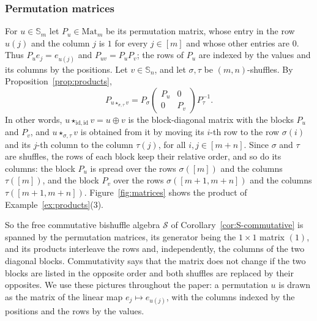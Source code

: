 \documentclass[11pt]{amsart}
\theoremstyle{definition}
\theoremstyle{remark}
\newcommand{\bS}{\mathbb{S}}
\newcommand{\cS}{\mathscr{S}}
\newcommand{\id}{\mathrm{id}}
\newcommand{\Mat}{\mathrm{Mat}}
\begin{document}
\subsubsection{Permutation matrices}
For $u\in\bS_m$ let $P_u\in\Mat_m$ be its permutation matrix, whose entry in the row $u(j)$ and the column $j$ is $1$ for every $j\in[m]$ and whose other entries are $0$. Thus $P_ue_j=e_{u(j)}$ and $P_{uv}=P_uP_v$; the rows of $P_u$ are indexed by the values and its columns by the positions. Let $v\in\bS_n$, and let $\sigma,\tau$ be $(m,n)$-shuffles. By Proposition~\ref{prop:products},
\[
P_{u\star_{\sigma,\tau}v}=P_\sigma\begin{pmatrix}P_u&0\\0&P_v\end{pmatrix}P_\tau^{-1}.
\]
In other words, $u\star_{\id,\id}v=u\oplus v$ is the block-diagonal matrix with the blocks $P_u$ and $P_v$, and $u\star_{\sigma,\tau}v$ is obtained from it by moving its $i$-th row to the row $\sigma(i)$ and its $j$-th column to the column $\tau(j)$, for all $i,j\in[m+n]$. Since $\sigma$ and $\tau$ are shuffles, the rows of each block keep their relative order, and so do its columns: the block $P_u$ is spread over the rows $\sigma([m])$ and the columns $\tau([m])$, and the block $P_v$ over the rows $\sigma([m+1,m+n])$ and the columns $\tau([m+1,m+n])$. Figure~\ref{fig:matrices} shows the product of Example~\ref{ex:products}(3).

So the free commutative bishuffle algebra $\cS$ of Corollary~\ref{cor:S-commutative} is spanned by the permutation matrices, its generator being the $1\times1$ matrix $(1)$, and its products interleave the rows and, independently, the columns of the two diagonal blocks. Commutativity says that the matrix does not change if the two blocks are listed in the opposite order and both shuffles are replaced by their opposites. We use these pictures throughout the paper: a permutation $u$ is drawn as the matrix of the linear map $e_j\mapsto e_{u(j)}$, with the columns indexed by the positions and the rows by the values.
\end{document}
